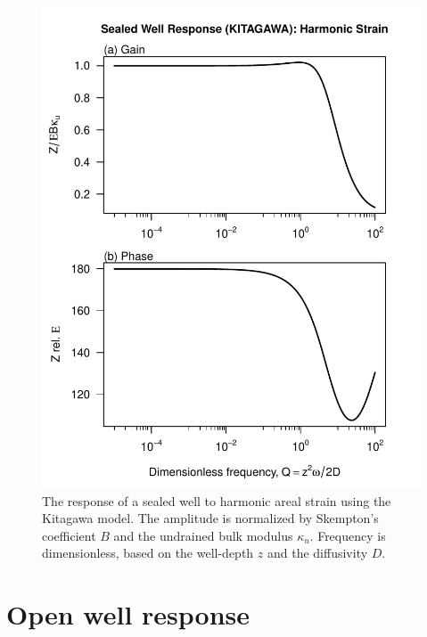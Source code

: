 \documentclass[12pt]{article}\usepackage[]{graphicx}\usepackage[]{color}
\makeatletter
\def\maxwidth{ %
  \ifdim\Gin@nat@width>\linewidth
    \linewidth
  \else
    \Gin@nat@width
  \fi
}
\newenvironment{knitrout}{}{} %
\makeatother
\begin{document}
\begin{figure}[htb!]
\begin{center}
\begin{knitrout}\small
{}\color{fgcolor}
\includegraphics[width=\maxwidth]{figure/KITRESPFIG} 

\end{knitrout}

\caption{The response of a sealed well to harmonic areal strain using
the Kitagawa model. The amplitude is normalized by Skempton's coefficient $B$
and the undrained bulk modulus $\kappa_u$.
Frequency is dimensionless, based on the well-depth $z$ and the diffusivity $D$.
}
\label{fig:wrsp}
\end{center}
\end{figure}

\clearpage
\section{Open well response}
\end{document}
